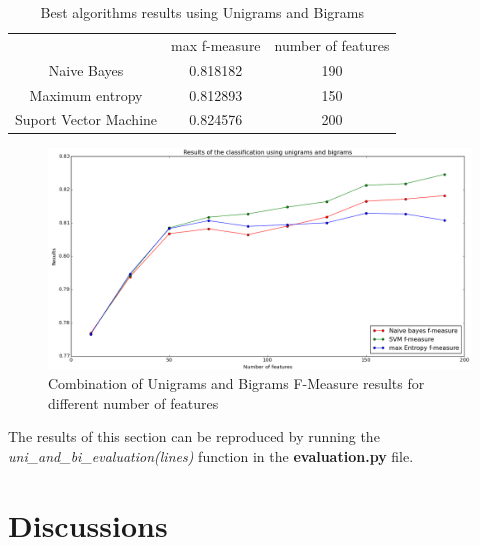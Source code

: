 \begin{table}[H]
\begin{tabular}{c|c|c}
		~	&				max f-measure 	& number of features \\
Naive Bayes				&	 0.818182 		&		190\\
Maximum entropy			&	 0.812893 		&		150\\
Suport Vector Machine	&	 0.824576 		&		200\\
\end{tabular}
\caption{Best algorithms results using Unigrams and Bigrams \label{tab:uni_bi_results}}
\end{table}

\begin{figure}[H]
  \centering
  \includegraphics[width=160mm]{figures/combination_graph.png}
  \caption{Combination of Unigrams and Bigrams F-Measure results for different number of features \label{fig:uni_bi_eval}}
\end{figure}


The results of this section can be reproduced by running the \emph{uni\_and\_bi\_evaluation(lines)} function in the  \textbf{evaluation.py} file.\\

\section{Discussions}
